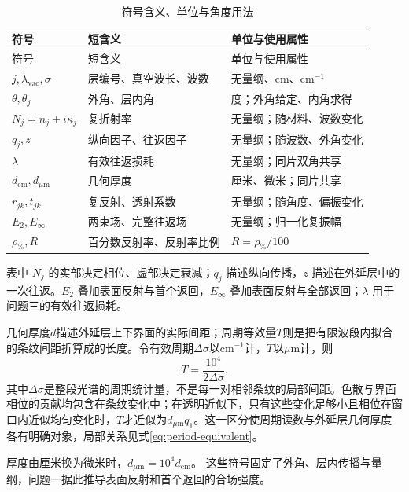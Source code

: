 \begingroup
{}
\setlength{\tabcolsep}{3pt}
\begin{longtable}{>{\centering\arraybackslash}p{} >{\centering\arraybackslash}p{} >{\centering\arraybackslash}p{}}
\caption{符号含义、单位与角度用法}\label{tab:03}\\
\hline
符号 & 短含义 & 单位与使用属性\\
\hline
\endfirsthead
\hline
符号 & 短含义 & 单位与使用属性\\
\hline
\endhead
$j,\lambda_{\mathrm{vac}},\sigma$ & 层编号、真空波长、波数 & 无量纲、$\mathrm{cm}$、$\mathrm{cm}^{-1}$\\
$\theta,\theta_j$ & 外角、层内角 & 度；外角给定、内角求得\\
$N_j=n_j+i\kappa_j$ & 复折射率 & 无量纲；随材料、波数变化\\
$q_j,z$ & 纵向因子、往返因子 & 无量纲；随波数、外角变化\\
$\lambda$ & 有效往返损耗 & 无量纲；同片双角共享\\
$d_{\mathrm{cm}},d_{\mu\mathrm{m}}$ & 几何厚度 & 厘米、微米；同片共享\\
$r_{jk},t_{jk}$ & 复反射、透射系数 & 无量纲；随角度、偏振变化\\
$E_2,E_\infty$ & 两束场、完整往返场 & 无量纲；归一化复振幅\\
$\rho_{\%},R$ & 百分数反射率、反射率比例 & $R=\rho_{\%}/100$\\
\hline
\end{longtable}
\endgroup

表中 $N_j$ 的实部决定相位、虚部决定衰减；$q_j$ 描述纵向传播，$z$ 描述在外延层中的一次往返。$E_2$ 叠加表面反射与首个返回，$E_\infty$ 叠加表面反射与全部返回；$\lambda$ 用于问题三的有效往返损耗。

几何厚度$d$描述外延层上下界面的实际间距；周期等效量$T$则是把有限波段内拟合的条纹间距折算成的长度。令有效周期$\Delta\sigma$以$\mathrm{cm}^{-1}$计，$T$以$\mu\mathrm{m}$计，则
\begin{equation}
T=\frac{10^4}{2\Delta\sigma}.
\end{equation}
其中$\Delta\sigma$是整段光谱的周期统计量，不是每一对相邻条纹的局部间距。色散与界面相位的贡献均包含在条纹变化中；在透明近似下，只有这些变化足够小且相位在窗口内近似均匀变化时，$T$才近似为$d_{\mu\mathrm{m}}q_1$。这一区分使周期读数与外延层几何厚度各有明确对象，局部关系见式\eqref{eq:period-equivalent}。

厚度由厘米换为微米时，$d_{\mu\mathrm{m}}=10^4d_{\mathrm{cm}}$。
这些符号固定了外角、层内传播与量纲，问题一据此推导表面反射和首个返回的合场强度。

